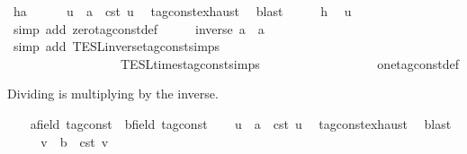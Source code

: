 \begin{isabellebody}
\ h{\isacharcolon}{\isacartoucheopen}a\ {\isasymnoteq}\ {}{\isacartoucheclose}\isanewline
\ \ \isamarkupfalse%
\ u\ \ {\isacartoucheopen}a\ {\isacharequal}\ {\isasymtau}\isactrlsub c\isactrlsub s\isactrlsub t\ u{\isacartoucheclose}\ \isamarkupfalse%
\ tag{\isacharunderscore}const{\isachardot}exhaust\ \isamarkupfalse%
\ blast\isanewline
\ \ \isamarkupfalse%
\ \isamarkupfalse%
\ h\ \isamarkupfalse%
\ {\isacartoucheopen}u\ {\isasymnoteq}\ {}{\isacartoucheclose}\ \isamarkupfalse%
\ {\isacharparenleft}simp\ add{\isacharcolon}\ zero{\isacharunderscore}tag{\isacharunderscore}const{\isacharunderscore}def{\isacharparenright}\isanewline
\ \ \isamarkupfalse%
\ \isamarkupfalse%
\ {\isacartoucheopen}inverse\ a\ {\isacharasterisk}\ a\ {\isacharequal}\ {}{\isacartoucheclose}\isanewline
\ \ \ \ \isamarkupfalse%
\ {\isacharparenleft}simp\ add{\isacharcolon}\ TESL{\isachardot}inverse{\isacharunderscore}tag{\isacharunderscore}const{\isachardot}simps\isanewline
\ \ \ \ \ \ \ \ \ \ \ \ \ \ \ \ \ \ TESL{\isachardot}times{\isacharunderscore}tag{\isacharunderscore}const{\isachardot}simps\isanewline
\ \ \ \ \ \ \ \ \ \ \ \ \ \ \ \ \ \ one{\isacharunderscore}tag{\isacharunderscore}const{\isacharunderscore}def{\isacharparenright}\isanewline
{}\isamarkupfalse%
%
\begin{isamarkuptext}%
Dividing is multiplying by the inverse.%
\end{isamarkuptext}\isamarkuptrue%
\ \ \isamarkupfalse%
\ a{\isacharcolon}{\isacharcolon}{\isacartoucheopen}{\isacharprime}{\isasymtau}{\isacharcolon}{\isacharcolon}field\ tag{\isacharunderscore}const{\isacartoucheclose}\ \ b{\isacharcolon}{\isacharcolon}{\isacartoucheopen}{\isacharprime}{\isasymtau}{\isacharcolon}{\isacharcolon}field\ tag{\isacharunderscore}const{\isacartoucheclose}\isanewline
\ \ \isamarkupfalse%
\ u\ \ {\isacartoucheopen}a\ {\isacharequal}\ {\isasymtau}\isactrlsub c\isactrlsub s\isactrlsub t\ u{\isacartoucheclose}\ \isamarkupfalse%
\ tag{\isacharunderscore}const{\isachardot}exhaust\ \isamarkupfalse%
\ blast\isanewline
\ \ \isamarkupfalse%
\ \isamarkupfalse%
\ v\ \ {\isacartoucheopen}b\ {\isacharequal}\ {\isasymtau}\isactrlsub c\isactrlsub s\isactrlsub t\ v{\isacartoucheclose}\ \isamarkupfalse%

\end{isabellebody}
